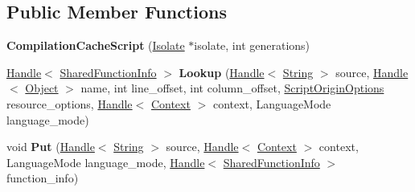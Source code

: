 \subsection*{Public Member Functions}
\begin{DoxyCompactItemize}
\item 
{\bfseries Compilation\+Cache\+Script} (\hyperlink{classv8_1_1internal_1_1_isolate}{Isolate} $\ast$isolate, int generations)\hypertarget{classv8_1_1internal_1_1_compilation_cache_script_aabe1ee606027fc5b1fbff216c090ae4f}{}\label{classv8_1_1internal_1_1_compilation_cache_script_aabe1ee606027fc5b1fbff216c090ae4f}

\item 
\hyperlink{classv8_1_1internal_1_1_handle}{Handle}$<$ \hyperlink{classv8_1_1internal_1_1_shared_function_info}{Shared\+Function\+Info} $>$ {\bfseries Lookup} (\hyperlink{classv8_1_1internal_1_1_handle}{Handle}$<$ \hyperlink{classv8_1_1internal_1_1_string}{String} $>$ source, \hyperlink{classv8_1_1internal_1_1_handle}{Handle}$<$ \hyperlink{classv8_1_1internal_1_1_object}{Object} $>$ name, int line\+\_\+offset, int column\+\_\+offset, \hyperlink{classv8_1_1_script_origin_options}{Script\+Origin\+Options} resource\+\_\+options, \hyperlink{classv8_1_1internal_1_1_handle}{Handle}$<$ \hyperlink{classv8_1_1internal_1_1_context}{Context} $>$ context, Language\+Mode language\+\_\+mode)\hypertarget{classv8_1_1internal_1_1_compilation_cache_script_a7223e1ea33c74248172ee7ff1ff1a085}{}\label{classv8_1_1internal_1_1_compilation_cache_script_a7223e1ea33c74248172ee7ff1ff1a085}

\item 
void {\bfseries Put} (\hyperlink{classv8_1_1internal_1_1_handle}{Handle}$<$ \hyperlink{classv8_1_1internal_1_1_string}{String} $>$ source, \hyperlink{classv8_1_1internal_1_1_handle}{Handle}$<$ \hyperlink{classv8_1_1internal_1_1_context}{Context} $>$ context, Language\+Mode language\+\_\+mode, \hyperlink{classv8_1_1internal_1_1_handle}{Handle}$<$ \hyperlink{classv8_1_1internal_1_1_shared_function_info}{Shared\+Function\+Info} $>$ function\+\_\+info)\hypertarget{classv8_1_1internal_1_1_compilation_cache_script_a155cf678b66e0c7cc3c2fda958982e03}{}\label{classv8_1_1internal_1_1_compilation_cache_script_a155cf678b66e0c7cc3c2fda958982e03}

\end{DoxyCompactItemize}

